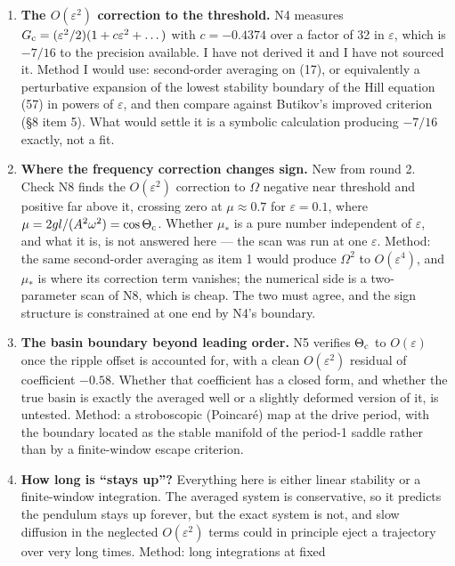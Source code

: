 \documentclass[11pt,a4paper]{article}
\providecommand{\tightlist}{\setlength{\itemsep}{0pt}\setlength{\parskip}{0pt}}
\begin{document}
\begin{enumerate}
\def\labelenumi{\arabic{enumi}.}
\tightlist
\item
  \textbf{The \(O(\varepsilon^2)\) correction to the threshold.} N4 measures
  \(G_{\rm c}=(\varepsilon^2/2)(1+c\varepsilon^2+\dots)\) with \(c=-0.4374\) over a
  factor of 32 in \(\varepsilon\), which is \(-7/16\) to the precision available. I
  have not derived it and I have not sourced it. Method I would use: second-order
  averaging on (17), or equivalently a perturbative expansion of the lowest
  stability boundary of the Hill equation (57) in powers of \(\varepsilon\), and
  then compare against Butikov's improved criterion (§8 item 5). What would
  settle it is a symbolic calculation producing \(-7/16\) exactly, not a fit.
\item
  \textbf{Where the frequency correction changes sign.} New from round 2. Check N8
  finds the \(O(\varepsilon^2)\) correction to \(\Omega\) negative near threshold
  and positive far above it, crossing zero at \(\mu\approx0.7\) for
  \(\varepsilon=0.1\), where \(\mu=2gl/(A^2\omega^2)=\cos\Theta_{\rm c}\). Whether
  \(\mu_\ast\) is a pure number independent of \(\varepsilon\), and what it is, is
  not answered here --- the scan was run at one \(\varepsilon\). Method: the same
  second-order averaging as item 1 would produce \(\Omega^2\) to
  \(O(\varepsilon^4)\), and \(\mu_\ast\) is where its correction term vanishes; the
  numerical side is a two-parameter scan of N8, which is cheap. The two must
  agree, and the sign structure is constrained at one end by N4's boundary.
\item
  \textbf{The basin boundary beyond leading order.} N5 verifies
  \(\Theta_{\rm c}\) to \(O(\varepsilon)\) once the ripple offset is accounted for,
  with a clean \(O(\varepsilon^2)\) residual of coefficient \(-0.58\). Whether that
  coefficient has a closed form, and whether the true basin is exactly the
  averaged well or a slightly deformed version of it, is untested. Method: a
  stroboscopic (Poincaré) map at the drive period, with the boundary located as
  the stable manifold of the period-1 saddle rather than by a finite-window
  escape criterion.
\item
  \textbf{How long is ``stays up''?} Everything here is either linear stability or a
  finite-window integration. The averaged system is conservative, so it predicts
  the pendulum stays up forever, but the exact system is not, and slow diffusion
  in the neglected \(O(\varepsilon^2)\) terms could in principle eject a
  trajectory over very long times. Method: long integrations at fixed

\end{enumerate}
\end{document}
